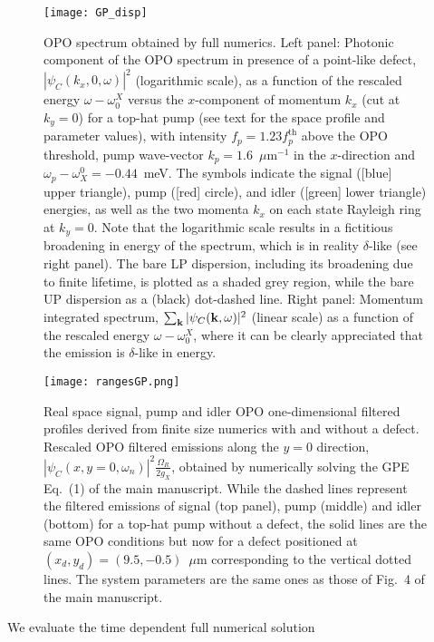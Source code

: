 %
\begin{figure}[tb]\centering
\texttt{[image: GP\_disp]}
\caption{OPO spectrum obtained by full numerics. Left
  panel: Photonic component of the OPO spectrum in presence of a
  point-like defect, $|\psi_C(k_x,0,\omega)|^2$ (logarithmic scale),
  as a function of the rescaled energy $\omega - \omega_0^X$ versus
  the $x$-component of momentum $k_x$ (cut at $k_y=0$) for a top-hat
  pump (see text for the space profile and parameter values), with
  intensity $f_p=1.23 f_p^{\text{th}}$ above the OPO threshold, pump
  wave-vector $k_p=1.6$~$\mu$m$^{-1}$ in the $x$-direction and
  $\omega_p-\omega_X^0=-0.44$~meV. The symbols indicate the signal
  ([blue] upper triangle), pump ([red] circle), and idler ([green]
  lower triangle) energies, as well as the two momenta $k_x$ on each
  state Rayleigh ring at $k_y=0$. Note that the logarithmic scale
  results in a fictitious broadening in energy of the spectrum, which
  is in reality $\delta$-like (see right panel). The bare LP
  dispersion, including its broadening due to finite lifetime, is
  plotted as a shaded grey region, while the bare UP dispersion as a
  (black) dot-dashed line. Right panel: Momentum integrated spectrum,
  $\sum_{\mathbf{k}} |\psi_C(\mathbf{k},\omega)|^2$ (linear scale) as a
  function of the rescaled energy $\omega - \omega_0^X$, where it can
  be clearly appreciated that the emission is $\delta$-like in
  energy.}
\label{fig:spectGP}
\end{figure}
%
\begin{figure}[tb]\centering
\texttt{[image: rangesGP.png]}
\caption{Real space signal, pump and idler OPO one-dimensional
  filtered profiles derived from finite size numerics with and without
  a defect. Rescaled OPO filtered emissions along the $y=0$ direction,
  $|\psi_C(x,y=0,\omega_n)|^2 \frac{\Omega_R}{2g_X}$, obtained by
  numerically solving the GPE Eq.~(1) of the main manuscript. While
  the dashed lines represent the filtered emissions of signal (top
  panel), pump (middle) and idler (bottom) for a top-hat pump without
  a defect, the solid lines are the same OPO conditions but now for a
  defect positioned at $(x_d, y_d) = (9.5, -0.5)$~$\mu$m corresponding
  to the vertical dotted lines. The system parameters are the same
  ones as those of Fig.~4 of the main manuscript.}
\label{fig:rafull}
\end{figure}
%
We evaluate the time dependent full numerical solution
